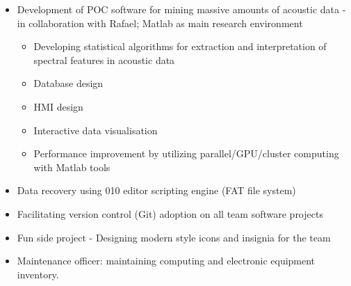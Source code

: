 \documentclass[11pt,a4paper,sans]{moderncv}        %
\begin{document}
{\begin{itemize}
\item Development of POC software for mining massive amounts of acoustic data - in collaboration with Rafael; Matlab as main research environment
  \begin{itemize}
  \item Developing statistical algorithms for extraction and interpretation of spectral features in acoustic data 
  \item Database design
  \item HMI design
  \item Interactive data visualisation
  \item Performance improvement by utilizing parallel/GPU/cluster computing with Matlab tools
  \end{itemize}
\item Data recovery using 010 editor scripting engine (FAT file system)
\item Facilitating  version control (Git) adoption on all team software projects
\item Fun side project - Designing modern style icons and insignia for the team
\item Maintenance officer: maintaining  computing and electronic equipment inventory.
\end{itemize}
}

\end{document}
